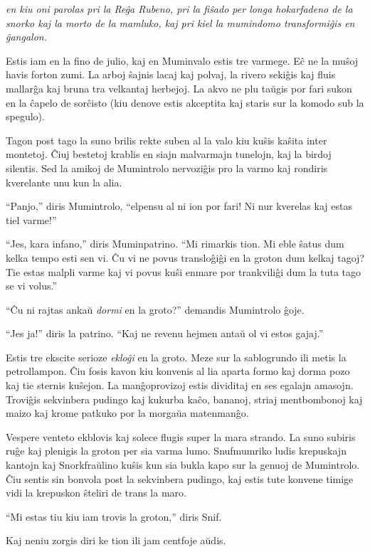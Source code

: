 \noindent\textit{en kiu oni parolas pri la Reĝa Rubeno, pri la fiŝado per longa hokarfadeno de la snorko kaj la morto de la mamluko, kaj pri kiel la mumindomo transformiĝis en ĝangalon.}
\hfill \break
\hypertarget{Kvina Ĉapitro}{}
\label{Kvina Ĉapitro}


\noindent Estis iam en la fino de julio, kaj en Muminvalo estis tre varmege. Eĉ ne la muŝoj havis forton zumi. La arboj ŝajnis lacaj kaj polvaj, la rivero sekiĝis kaj fluis mallarĝa kaj bruna tra velkantaj herbejoj. La akvo ne plu taŭgis por fari sukon en la ĉapelo de sorĉisto (kiu denove estis akceptita kaj staris sur la komodo sub la spegulo).

Tagon post tago la suno brilis rekte suben al la valo kiu kuŝis kaŝita inter montetoj. Ĉiuj bestetoj krablis en siajn malvarmajn tunelojn, kaj la birdoj silentis. Sed la amikoj de Mumintrolo nervoziĝis pro la varmo kaj rondiris kverelante unu kun la alia.

``Panjo,'' diris Mumintrolo, ``elpensu al ni ion por fari! Ni nur kverelas kaj estas tiel varme!''

``Jes, kara infano,'' diris Muminpatrino. ``Mi rimarkis tion. Mi eble ŝatus dum kelka tempo esti sen vi. Ĉu vi ne povus transloĝiĝi en la groton dum kelkaj tagoj? Tie estas malpli varme kaj vi povus kuŝi enmare por trankviliĝi dum la tuta tago se vi volus.''

``Ĉu ni rajtas ankaŭ \emph{dormi} en la groto?'' demandis Mumintrolo ĝoje.

``Jes ja!'' diris la patrino. ``Kaj ne revenu hejmen antaŭ ol vi estos gajaj.''

Estis tre ekscite serioze \emph{ekloĝi} en la groto. Meze sur la sablogrundo ili metis la petrollampon. Ĉiu fosis kavon kiu konvenis al lia aparta formo kaj dorma pozo kaj tie sternis kuŝejon. La manĝoprovizoj estis dividitaj en ses egalajn amasojn. Troviĝis sekvinbera pudingo kaj kukurba kaĉo, bananoj, striaj mentbombonoj kaj maizo kaj krome patkuko por la morgaŭa matenmanĝo.

Vespere venteto ekblovis kaj solece flugis super la mara strando. La suno subiris ruĝe kaj plenigis la groton per sia varma lumo. Snufmumriko ludis krepuskajn kantojn kaj Snorkfraŭlino kuŝis kun sia bukla kapo sur la genuoj de Mumintrolo. Ĉiu sentis sin bonvola post la sekvinbera pudingo, kaj estis tute konvene timige vidi la krepuskon ŝteliri de trans la maro.

``Mi estas tiu kiu iam trovis la groton,'' diris Snif.

Kaj neniu zorgis diri ke tion ili jam centfoje aŭdis.

